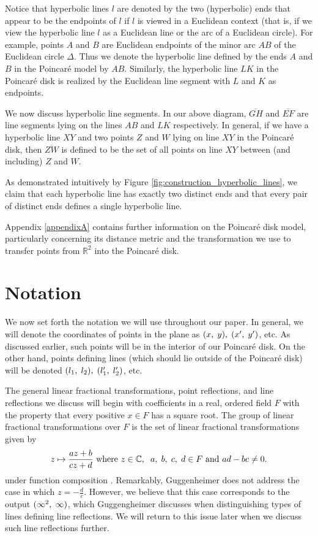 \documentclass[12pt]{article}
\newcommand{\R}{\mathbb{R}}
\newcommand{\C}{\mathbb{C}}
\newcommand{\ttc}{, \hspace{1mm}}
\newcommand{\poincare}{Poincar\'{e} }
\newcommand{\specialend}{(\infty^2\ttc\infty)}
\theoremstyle{plain}
\theoremstyle{definition}
\begin{document}
Notice that hyperbolic lines $l$ are denoted by the two (hyperbolic) ends that appear to be the endpoints of $l$ if $l$ is viewed in a Euclidean context (that is, if we view the hyperbolic line $l$ as a Euclidean line or the arc of a Euclidean circle). For example, points $A$ and $B$ are Euclidean endpoints of the minor arc $AB$ of the Euclidean circle $\Delta$. Thus we denote the hyperbolic line defined by the ends $A$ and $B$ in the \poincare model by $AB$. Similarly, the hyperbolic line $LK$ in the \poincare disk is realized by the Euclidean line segment with $L$ and $K$ as endpoints. 

We now discuss hyperbolic line segments. In our above diagram, $\overline{GH}$ and $\overline{EF}$ are line segments lying on the lines $AB$ and $LK$ respectively. In general, if we have a hyperbolic line $XY$ and two points $Z$ and $W$ lying on line $XY$ in the \poincare disk, then $\overline{ZW}$ is defined to be the set of all points on line $XY$ between (and including) $Z$ and $W$.

As demonstrated intuitively by Figure \ref{fig:construction_hyperbolic_lines}, we claim that each hyperbolic line has exactly two distinct ends and that every pair of distinct ends defines a single hyperbolic line.

Appendix \ref{appendixA} contains further information on the \poincare disk model, particularly concerning its distance metric and the transformation we use to transfer points from $\R^2$ into the \poincare disk. 

\section{Notation}
	
\hspace{10mm} We now set forth the notation we will use throughout our paper. In general, we will denote the coordinates of points in the plane as $(x \ttc y) \ttc (x' \ttc y')$, etc. As discussed earlier, such points will be in the interior of our \poincare disk. On the other hand, points defining lines (which should lie outside of the \poincare disk) will be denoted $(l_1 \ttc l_2) \ttc (l_1' \ttc l_2')$, etc. 

The general linear fractional transformations, point reflections, and line reflections we discuss will begin with coefficients in a real, ordered field $F$ with the property that every positive $x \in F$ has a square root. The group of linear fractional transformations over $F$ is the set of linear fractional transformations given by
\begin{equation} 
	z \mapsto \frac{az+b}{cz+d} \text{ where } z \in \C, \hspace{2mm} a \ttc b \ttc c \ttc d \in F \text{ and } ad-bc \neq 0. 
\end{equation}
under function composition \cite{shuman_lfts}. Remarkably, Guggenheimer does not address the case in which $z = -\frac{d}{c}$. However, we believe that this case corresponds to the output $\specialend$, which Guggengheimer discusses when distinguishing types of lines defining line reflections. We will return to this issue later when we discuss such line reflections further. 
\end{document}
